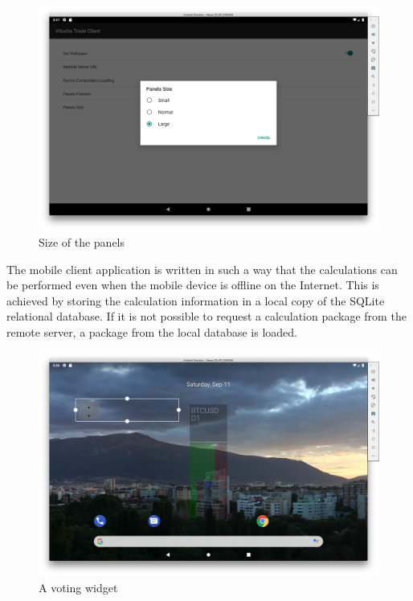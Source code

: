 \documentclass[a4paper,conference]{IEEEtran}
\begin{document}
\begin{figure}[htbp]
\centerline{\includegraphics[width=1.0\linewidth]{fig06.png}}
\caption{Size of the panels}
\label{fig06}
\end{figure}

The mobile client application is written in such a way that the calculations can be performed even when the mobile device is offline on the Internet. This is achieved by storing the calculation information in a local copy of the SQLite relational database. If it is not possible to request a calculation package from the remote server, a package from the local database is loaded. 

\begin{figure}[htbp]
\centerline{\includegraphics[width=1.0\linewidth]{fig07.png}}
\caption{A voting widget}
\label{fig07}
\end{figure}
\end{document}
